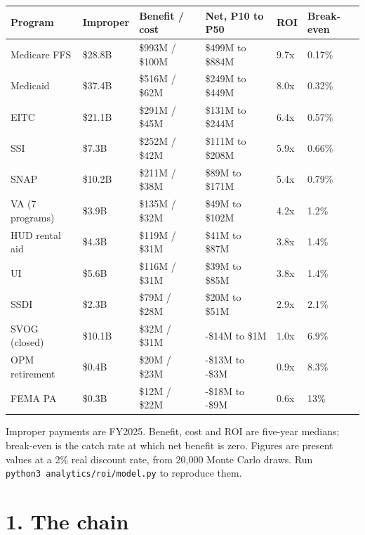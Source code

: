 \documentclass[letterpaper,11pt]{article}
\begin{document}
\begingroup\small\setlength{\tabcolsep}{4pt}\renewcommand{\arraystretch}{1.25}
\begin{longtable}[l]{@{}>{\raggedright\arraybackslash}p{}l>{\raggedright\arraybackslash}p{}>{\raggedright\arraybackslash}p{}ll@{}}
\rowcolor{coolblack}\leavevmode\color{white}\bfseries Program & \leavevmode\color{white}\bfseries Improper & \leavevmode\color{white}\bfseries Benefit / cost & \leavevmode\color{white}\bfseries Net, P10 to P50 & \leavevmode\color{white}\bfseries ROI & \leavevmode\color{white}\bfseries Break-even \\
\endhead
Medicare FFS & \$28.8B & \$993M / \$100M & \$499M to \$884M & 9.7x & 0.17\% \\
Medicaid & \$37.4B & \$516M / \$62M & \$249M to \$449M & 8.0x & 0.32\% \\
EITC & \$21.1B & \$291M / \$45M & \$131M to \$244M & 6.4x & 0.57\% \\
SSI & \$7.3B & \$252M / \$42M & \$111M to \$208M & 5.9x & 0.66\% \\
SNAP & \$10.2B & \$211M / \$38M & \$89M to \$171M & 5.4x & 0.79\% \\
VA (7 programs) & \$3.9B & \$135M / \$32M & \$49M to \$102M & 4.2x & 1.2\% \\
HUD rental aid & \$4.3B & \$119M / \$31M & \$41M to \$87M & 3.8x & 1.4\% \\
UI & \$5.6B & \$116M / \$31M & \$39M to \$85M & 3.8x & 1.4\% \\
SSDI & \$2.3B & \$79M / \$28M & \$20M to \$51M & 2.9x & 2.1\% \\
SVOG (closed) & \$10.1B & \$32M / \$31M & -\$14M to \$1M & 1.0x & 6.9\% \\
OPM retirement & \$0.4B & \$20M / \$23M & -\$13M to -\$3M & 0.9x & 8.3\% \\
FEMA PA & \$0.3B & \$12M / \$22M & -\$18M to -\$9M & 0.6x & 13\% \\
\end{longtable}\endgroup

Improper payments are FY2025. Benefit, cost and ROI are five-year
medians; break-even is the catch rate at which net benefit is zero.
Figures are present values at a 2\% real discount rate, from 20,000
Monte Carlo draws. Run \texttt{python3\ analytics/roi/model.py} to
reproduce them.

\hypertarget{the-chain}{%
\section*{1. The chain}\label{the-chain}}
\end{document}
